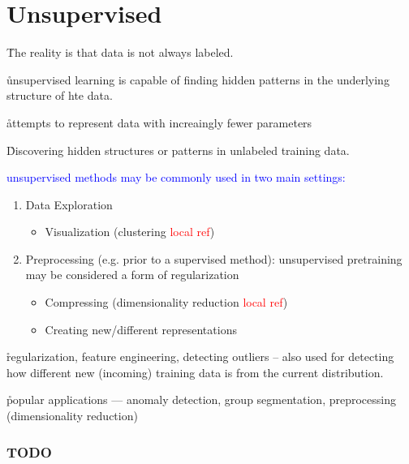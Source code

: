 


\chapter{Unsupervised}

\r{The reality is that data is not always labeled.}

\r{unsupervised learning is capable of finding hidden patterns in the underlying structure of hte data.}

\r{attempts to represent data with increaingly fewer parameters}

\r{Discovering hidden structures or patterns in unlabeled training data.}


\textcolor{blue}{unsupervised methods may be commonly used in two main settings:}
\begin{enumerate}[noitemsep,topsep=0pt]
	\item Data Exploration
	\begin{itemize}[noitemsep,topsep=0pt]
		\item Visualization (clustering \textcolor{red}{local ref})
	\end{itemize}
	\item Preprocessing (e.g. prior to a supervised method): unsupervised pretraining may be considered a form of regularization
	\begin{itemize}[noitemsep,topsep=0pt]
		\item Compressing (dimensionality reduction \textcolor{red}{local ref})
		\item Creating new/different representations
	\end{itemize}
\end{enumerate}

\r{regularization, feature engineering, detecting outliers -- also used for detecting how different new (incoming) training data is from the current distribution.}

\r{popular applications --- anomaly detection, group segmentation, preprocessing (dimensionality reduction)}

\subsection{TODO}

